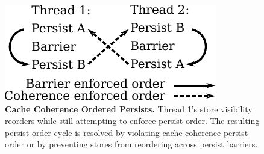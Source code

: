 \begin{figure}
  \centering
  \includegraphics[width=.45\linewidth]{Persistency/cycle.pdf}
  \caption{\textbf{Cache Coherence Ordered Persists.} Thread 1's store visibility reorders while still attempting to enforce persist order.  The resulting persist order cycle is resolved by violating cache coherence persist order or by preventing stores from reordering across persist barriers.}
  \label{fig::Cycle}
\end{figure}
